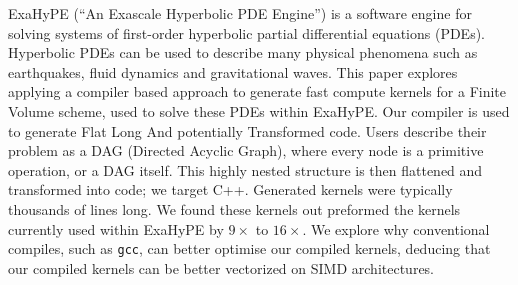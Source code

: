 ExaHyPE (``An Exascale Hyperbolic PDE Engine'') is a software engine for solving systems of first-order hyperbolic partial differential equations (PDEs).
Hyperbolic PDEs can be used to describe many physical phenomena such as earthquakes, fluid dynamics and gravitational waves.
This paper explores applying a compiler based approach to generate fast compute kernels for a Finite Volume scheme, used to solve these PDEs within ExaHyPE.
Our compiler \phlat is used to generate Flat Long And potentially Transformed code.
Users describe their problem as a DAG (Directed Acyclic Graph), where every node is a primitive operation, or a DAG itself.
This highly nested structure is then flattened and transformed into code; we target C++.
Generated kernels were typically thousands of lines long.
We found these kernels out preformed the kernels currently used within ExaHyPE by $9\times$ to $16\times$.
We explore why conventional compiles, such as \texttt{gcc}, can better optimise our compiled kernels, deducing that our compiled kernels can be better vectorized on SIMD architectures. 
